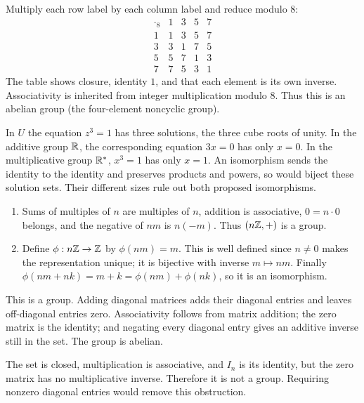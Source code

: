 
Multiply each row label by each column label and reduce modulo $8$:
\[\begin{array}{c|rrrr}\cdot_8&1&3&5&7\\\hline1&1&3&5&7\\3&3&1&7&5\\5&5&7&1&3\\7&7&5&3&1\end{array}\]
The table shows closure, identity $1$, and that each element is its own inverse. Associativity is inherited from integer multiplication modulo $8$. Thus this is an abelian group (the four-element noncyclic group).


In $U$ the equation $z^3=1$ has three solutions, the three cube roots of unity. In the additive group $\mathbb{R}$, the corresponding equation $3x=0$ has only $x=0$. In the multiplicative group $\mathbb{R}^*$, $x^3=1$ has only $x=1$. An isomorphism sends the identity to the identity and preserves products and powers, so would biject these solution sets. Their different sizes rule out both proposed isomorphisms.


\begin{enumerate}[label=(\alph*)]
\item Sums of multiples of $n$ are multiples of $n$, addition is associative, $0=n\cdot0$ belongs, and the negative of $nm$ is $n(-m)$. Thus $(n\mathbb{Z},+)$ is a group.
\item Define $\phi:n\mathbb{Z}\to\mathbb{Z}$ by $\phi(nm)=m$. This is well defined since $n\ne0$ makes the representation unique; it is bijective with inverse $m\mapsto nm$. Finally $\phi(nm+nk)=m+k=\phi(nm)+\phi(nk)$, so it is an isomorphism.
\end{enumerate}


This is a group. Adding diagonal matrices adds their diagonal entries and leaves off-diagonal entries zero. Associativity follows from matrix addition; the zero matrix is the identity; and negating every diagonal entry gives an additive inverse still in the set. The group is abelian.


The set is closed, multiplication is associative, and $I_n$ is its identity, but the zero matrix has no multiplicative inverse. Therefore it is not a group. Requiring nonzero diagonal entries would remove this obstruction.

